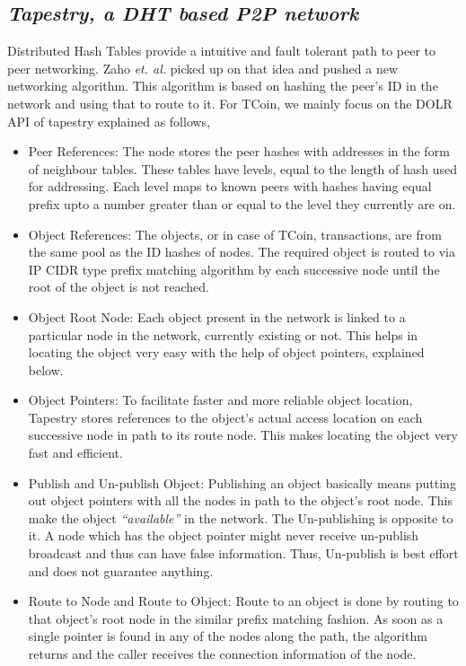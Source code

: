 \documentclass[conference,a4paper,12pt]{IEEEtran}
\begin{document}
\subsection{\textit{Tapestry, a DHT based P2P network}}
Distributed Hash Tables \cite{dht} provide a intuitive and fault tolerant path to peer to peer networking. Zaho \textit{et. al.} \cite{tapestry_dolr} \cite{tapestry_infra} picked up on that idea and pushed a new networking algorithm. This algorithm is based on hashing the peer's ID in the network and using that to route to it. For TCoin, we mainly focus on the DOLR API of tapestry explained as follows,
	\begin{itemize}
	\item{Peer References: }
	The node stores the peer hashes with addresses in the form of neighbour tables. These tables have levels, equal to the length of hash used for addressing. Each level maps to known peers with hashes having equal prefix upto a number greater than or equal to the level they currently are on.
	\item{Object References: }
	The objects, or in case of TCoin, transactions, are from the same pool as the ID hashes of nodes. The required object is routed to via IP CIDR type prefix matching algorithm by each successive node until the root of the object is not reached.
	\item{Object Root Node: }
	Each object present in the network is linked to a particular node in the network, currently existing or not. This helps in locating the object very easy with the help of object pointers, explained below.
	\item{Object Pointers: }
	To facilitate faster and more reliable object location, Tapestry stores references to the object's actual access location on each successive node in path to its route node. This makes locating the object very fast and efficient.
	\item{Publish and Un-publish Object: }
	Publishing an object basically means putting out object pointers with all the nodes in path to the object's root node. This make the object \textit{``available''} in the network. The Un-publishing is opposite to it. A node which has the object pointer might never receive un-publish broadcast and thus can have false information. Thus, Un-publish is best effort and does not guarantee anything.
	\item{Route to Node and Route to Object: }
	Route to an object is done by routing to that object's root node in the similar prefix matching fashion. As soon as a single pointer is found in any of the nodes along the path, the algorithm returns and the caller receives the connection information of the node.
	\end{itemize}
	
\end{document}
